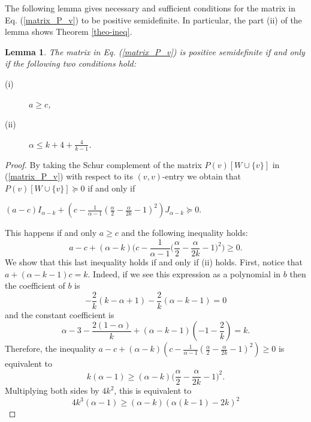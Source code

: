 \documentclass[11pt]{article}
\newtheorem{lemma}[theorem]{Lemma}
\numberwithin{equation}{section}
\begin{document}
The following lemma gives necessary and sufficient conditions for the matrix in Eq. (\ref{matrix_P_v}) to be positive semidefinite. In particular, the part (ii) of the lemma shows Theorem \ref{theo-ineq}.

\begin{lemma}\label{matrix_P_v-psd}
The matrix in Eq. (\ref{matrix_P_v}) is positive semidefinite if and only if the following two conditions hold:
\begin{description}
\item[(i)]$a\geq c$,
\item[(ii)]$\alpha\leq k+4+\frac{4}{k-1}$.
\end{description}
\end{lemma}

\begin{proof}
By taking the Schur complement of the matrix $P(v)[W\cup\{v\}]$ in (\ref{matrix_P_v}) with respect to its  $(v,v)$-entry  we obtain that $P(v)[W\cup\{v\}]\succeq 0$ if and only if 
\begin{center}
    $(a-c)I_{\alpha-k}+(c-\frac{1}{\alpha-1}(\frac{\alpha}{2}-\frac{\alpha}{2k}-1)^2)J_{\alpha-k}\succeq 0$.
\end{center}
This  happens if and only $a\geq c$ and the following inequality holds:
    $$a-c+ (\alpha-k)\Big(c-\frac{1}{\alpha-1}\big(\frac{\alpha}{2}-\frac{\alpha}{2k}-1\big)^2\Big)\geq 0.$$
We show that this last inequality holds if and only if (ii) holds. First, notice that $a+(\alpha-k-1)c=k$. Indeed, if we see this expression as a polynomial in $b$ then 
 the coefficient of $b$ is 
$$ -\frac{2}{k}(k-\alpha+1)- \frac{2}{k}(\alpha-k-1)=0$$
and the constant coefficient is 
    $$\alpha-3-\frac{2(1-\alpha)}{k}+(\alpha-k-1)(-1-\frac{2}{k})=k.$$
Therefore, the inequality $a-c+(\alpha-k)(c-\frac{1}{\alpha-1}(\frac{\alpha}{2}-\frac{\alpha}{2k}-1)^2)\geq 0$ is equivalent to 
    $$k(\alpha-1)\geq (\alpha-k)\Big(\frac{\alpha}{2}-\frac{\alpha}{2k}-1\Big)^2.$$
Multiplying both sides by $4k^2$, this  is equivalent to
    $$4k^3(\alpha-1)\geq (\alpha-k)(\alpha(k-1)-2k)^2$$

\end{proof}
\end{document}
